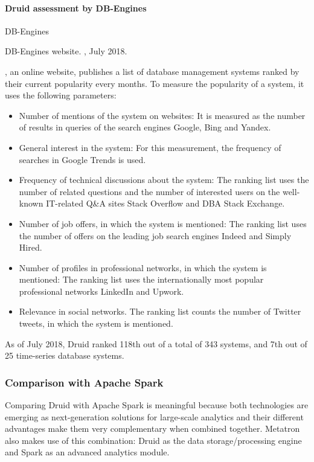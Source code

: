 \documentclass[letterpaper,10pt,english]{sphinxmanual}
\begin{document}
\paragraph{Druid assessment by DB-Engines}
\label{\detokenize{discovery/part01/druid_tests:db-engines-druid}}
DB-Engines%
\begin{footnote}[3]\sphinxAtStartFootnote
DB-Engines website. , July 2018.
%
\end{footnote}, an online website, publishes a list of database management systems ranked by their current popularity every months. To measure the popularity of a system, it uses the following parameters:
\begin{itemize}
\item {} 
Number of mentions of the system on websites: It is measured as the number of results in queries of the search engines Google, Bing and Yandex.

\item {} 
General interest in the system: For this measurement, the frequency of searches in Google Trends is used.

\item {} 
Frequency of technical discussions about the system: The ranking list uses the number of related questions and the number of interested users on the well-known IT-related Q\&A sites Stack Overflow and DBA Stack Exchange.

\item {} 
Number of job offers, in which the system is mentioned: The ranking list uses the number of offers on the leading job search engines Indeed and Simply Hired.

\item {} 
Number of profiles in professional networks, in which the system is mentioned: The ranking list uses the internationally most popular professional networks LinkedIn and Upwork.

\item {} 
Relevance in social networks. The ranking list counts the number of Twitter tweets, in which the system is mentioned.

\end{itemize}

As of July 2018, Druid ranked 118th out of a total of 343 systems, and 7th out of 25 time-series database systems.


\subsubsection{Comparison with Apache Spark}
\label{\detokenize{discovery/part01/druid_tests:apache-spark}}
Comparing Druid with Apache Spark is meaningful because both technologies are emerging as next-generation solutions for large-scale analytics and their different advantages make them very complementary when combined together. Metatron also makes use of this combination: Druid as the data storage/processing engine and Spark as an advanced analytics module.
\end{document}
